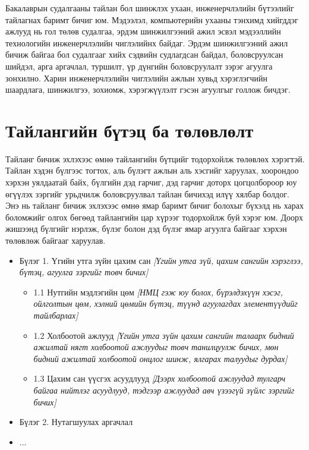 Бакалаврын судалгааны тайлан бол шинжлэх ухаан, инженерчлэлийн бүтээлийг тайлагнах баримт бичиг юм. Мэдээлэл, компьютерийн ухааны тэнхимд хийгддэг ажлууд нь гол төлөв судалгаа, эрдэм шинжилгээний ажил эсвэл мэдээллийн технологийн инженерчлэлийн чиглэлийнх байдаг. Эрдэм шинжилгээний ажил бичиж байгаа бол судалгааг хийх сэдвийн судлагдсан байдал, боловсруулсан шийдэл, арга аргачлал, туршилт, үр дүнгийн боловсруулалт зэрэг агуулга зонхилно. Харин инженерчлэлийн чиглэлийн ажлын хувьд хэрэглэгчийн шаардлага, шинжилгээ, зохиомж, хэрэгжүүлэлт гэсэн агуулгыг голлож бичдэг.

\section{Тайлангийн бүтэц ба төлөвлөлт}
Тайланг бичиж эхлэхээс өмнө тайлангийн бүтцийг тодорхойлж төлөвлөх хэрэгтэй. Тайлан хэдэн бүлгээс тогтох, аль бүлэгт ажлын аль хэсгийг харуулах, хоорондоо хэрхэн уялдаатай байх, бүлгийн дэд гарчиг, дэд гарчиг доторх цогцолбороор юу өгүүлэх зэргийг урьдчилж боловсруулвал тайлан бичихэд илүү хялбар болдог. Энэ нь тайланг бичиж эхлэхээс өмнө ямар баримт бичиг болохыг бүхэлд нь харах боломжийг олгох бөгөөд тайлангийн цар хүрээг тодорхойлж буй хэрэг юм. Доорх жишээнд бүлгийг нэрлэж, бүлэг болон дэд бүлэг ямар агуулга байгааг хэрхэн төлөвлөж байгааг харуулав.

\begin{itemize}
	\item Бүлэг 1. Үгийн утга зүйн цахим сан
	\textit{[Үгийн утга зүй, цахим сангийн хэрэглээ, бүтэц, агуулга зэргийг товч бичих]}
	\begin{itemize}
	    \item 1.1 Нутгийн мэдлэгийн цөм \textit{[НМЦ гэж юу болох, бүрэлдэхүүн хэсэг, ойлголтын цөм, хэлний цөмийн бүтэц, түүнд агуулагдах элементүүдийг тайлбарлах]}
	    \item 1.2 Холбоотой ажлууд \textit{[Үгийн утга зүйн цахим сангийн талаарх бидний ажилтай нягт холбоотой ажлуудыг товч танилцуулж бичих, мөн бидний ажилтай холбоотой онцлог шинж, ялгарах талуудыг дурдах]}
	    \item 1.3 Цахим сан үүсгэх асуудлууд \textit{[Дээрх холбоотой ажлуудад тулгарч байгаа нийтлэг асуудлууд, тэдгээр ажлуудад авч үзээгүй зүйлс зэргийг бичих]}
	\end{itemize}
	\item Бүлэг 2. Нутагшуулах аргачлал
	\item ...
\end{itemize}

